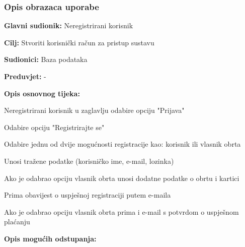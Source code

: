 				\subsubsection{Opis obrazaca uporabe}
				
				\noindent {}
					\begin{packed_item}
	
						\item \textbf{Glavni sudionik: } Neregistrirani korisnik
						\item  \textbf{Cilj:} Stvoriti korisnički račun za pristup sustavu 
						\item  \textbf{Sudionici:} Baza podataka
						\item  \textbf{Preduvjet:} -
						\item  \textbf{Opis osnovnog tijeka:}
						
						\item[] \begin{packed_enum}
	
							\item Neregistrirani korisnik u zaglavlju odabire opciju "Prijava"
							\item Odabire opciju "Registrirajte se"
							\item Odabire jednu od dvije mogućnosti registracije kao: korisnik ili vlasnik obrta
							\item Unosi tražene podatke (korisničko ime, e-mail, lozinka)
							\item[] \begin{packed_enum}
                                \item Ako je odabrao opciju vlasnik obrta unosi dodatne podatke o obrtu i kartici
							\end{packed_enum}
							\item Prima obavijest o uspješnoj registraciji putem e-maila
                            \item[] \begin{packed_enum}
                                \item Ako je odabrao opciju vlasnik obrta prima i e-mail s potvrdom o uspješnom plaćanju
							\end{packed_enum}
						\end{packed_enum}
						
						\item  \textbf{Opis mogućih odstupanja:}
						
						\item[] \begin{packed_item}
	

\end{packed_item}
\end{packed_item}
